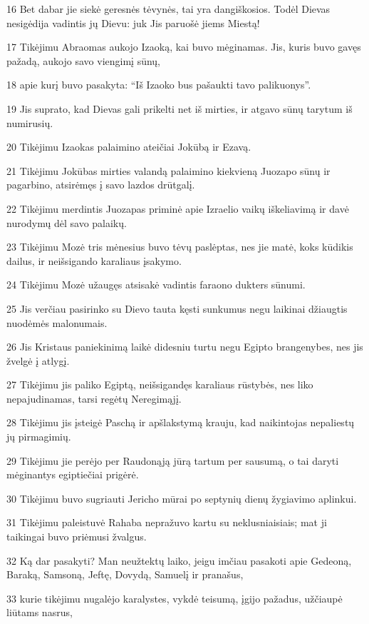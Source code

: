 \par 16 Bet dabar jie siekė geresnės tėvynės, tai yra dangiškosios. Todėl Dievas nesigėdija vadintis jų Dievu: juk Jis paruošė jiems Miestą! 
\par 17 Tikėjimu Abraomas aukojo Izaoką, kai buvo mėginamas. Jis, kuris buvo gavęs pažadą, aukojo savo viengimį sūnų, 
\par 18 apie kurį buvo pasakyta: “Iš Izaoko bus pašaukti tavo palikuonys”. 
\par 19 Jis suprato, kad Dievas gali prikelti net iš mirties, ir atgavo sūnų tarytum iš numirusių. 
\par 20 Tikėjimu Izaokas palaimino ateičiai Jokūbą ir Ezavą. 
\par 21 Tikėjimu Jokūbas mirties valandą palaimino kiekvieną Juozapo sūnų ir pagarbino, atsirėmęs į savo lazdos drūtgalį. 
\par 22 Tikėjimu merdintis Juozapas priminė apie Izraelio vaikų iškeliavimą ir davė nurodymų dėl savo palaikų. 
\par 23 Tikėjimu Mozė tris mėnesius buvo tėvų paslėptas, nes jie matė, koks kūdikis dailus, ir neišsigando karaliaus įsakymo. 
\par 24 Tikėjimu Mozė užaugęs atsisakė vadintis faraono dukters sūnumi. 
\par 25 Jis verčiau pasirinko su Dievo tauta kęsti sunkumus negu laikinai džiaugtis nuodėmės malonumais. 
\par 26 Jis Kristaus paniekinimą laikė didesniu turtu negu Egipto brangenybes, nes jis žvelgė į atlygį. 
\par 27 Tikėjimu jis paliko Egiptą, neišsigandęs karaliaus rūstybės, nes liko nepajudinamas, tarsi regėtų Neregimąjį. 
\par 28 Tikėjimu jis įsteigė Paschą ir apšlakstymą krauju, kad naikintojas nepaliestų jų pirmagimių. 
\par 29 Tikėjimu jie perėjo per Raudonąją jūrą tartum per sausumą, o tai daryti mėginantys egiptiečiai prigėrė. 
\par 30 Tikėjimu buvo sugriauti Jericho mūrai po septynių dienų žygiavimo aplinkui. 
\par 31 Tikėjimu paleistuvė Rahaba nepražuvo kartu su neklusniaisiais; mat ji taikingai buvo priėmusi žvalgus. 
\par 32 Ką dar pasakyti? Man neužtektų laiko, jeigu imčiau pasakoti apie Gedeoną, Baraką, Samsoną, Jeftę, Dovydą, Samuelį ir pranašus, 
\par 33 kurie tikėjimu nugalėjo karalystes, vykdė teisumą, įgijo pažadus, užčiaupė liūtams nasrus, 
